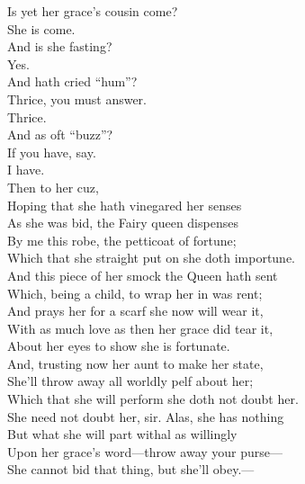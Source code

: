 \documentclass[a4paper,oneside,12pt]{memoir}
\begin{document}
\begin{drama*}
\subtlespeaks Is yet her grace's cousin come?\\
\facespeaks {} She is come.\\
\subtlespeaks And is she fasting?\\
\facespeaks {} Yes.\\
\subtlespeaks {} And hath cried ``hum''?\\
\facespeaks Thrice, you must answer.\\
\dapperspeaks {} Thrice.\\
\subtlespeaks {} And as oft ``buzz''?\\
\facespeaks If you have, say.\\
\dapperspeaks {} I have.\\
\subtlespeaks {} Then to her cuz,\\
Hoping that she hath vinegared her senses\\
As she was bid, the Fairy queen dispenses\\
By me this robe, the petticoat of fortune;\\
Which that she straight put on she doth importune.\\
And this piece of her smock the Queen hath sent\\
Which, being a child, to wrap her in was rent;\\
And prays her for a scarf she now will wear it,\\
With as much love as then her grace did tear it,\\
About her eyes to show she is fortunate.\\
And, trusting now her aunt to make her state,\\
She'll throw away all worldly pelf about her;\\
Which that she will perform she doth not doubt her.\\
\facespeaks She need not doubt her, sir. Alas, she has nothing\\
But what she will part withal as willingly\\
Upon her grace's word---throw away your purse---\\
She cannot bid that thing, but she'll obey.---\\

\end{drama*}
\end{document}
